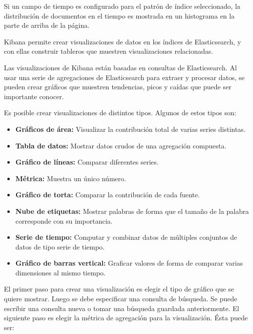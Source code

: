 Si un campo de tiempo es configurado para el patrón de índice seleccionado, la distribución de documentos en el tiempo es mostrada en un histograma en la parte de arriba de la página.

Kibana permite crear visualizaciones de datos en los índices de Elasticsearch, y con ellas construir tableros que muestren visualizaciones relacionadas.

Las visualizaciones de Kibana están basadas en consultas de Elasticsearch. Al usar una serie de agregaciones de Elasticsearch para extraer y procesar datos, se pueden crear gráficos que muestren tendencias, picos y caídas que puede ser importante conocer.

Es posible crear visualizaciones de distintos tipos. Algunos de estos tipos son:


\begin{itemize}

  \item \textbf{Gráficos de área:}
  Visualizar la contribución total de varias series distintas.

  \item \textbf{Tabla de datos:}
  Mostrar datos crudos de una agregación compuesta.

  \item \textbf{Gráfico de líneas:}
  Comparar diferentes series.

  \item \textbf{Métrica:}
  Muestra un único número.

  \item \textbf{Gráfico de torta:}
  Comparar la contribución de cada fuente.

  \item \textbf{Nube de etiquetas:}
  Mostrar palabras de forma que el tamaño de la palabra corresponde con su importancia.

  \item \textbf{Serie de tiempo:}
  Computar y combinar datos de múltiples conjuntos de datos de tipo serie de tiempo.

  \item \textbf{Gráfico de barras vertical:}
  Graficar valores de forma de comparar varias dimensiones al mismo tiempo.

\end{itemize}


El primer paso para crear una visualización es elegir el tipo de gráfico que se quiere mostrar. Luego se debe especificar una consulta de búsqueda. Se puede escribir una consulta nueva o tomar una búsqueda guardada anteriormente. El siguiente paso es elegir la métrica de agregación para la visualización. Ésta puede ser:

